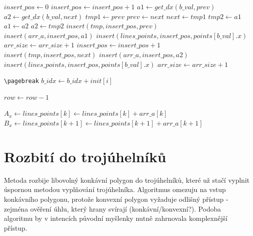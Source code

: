 \documentclass[a4paper,12pt]{report}
\begin{document}
\begin{algorithm}[H]
\begin{algorithmic}
\State $insert\_pos \gets 0$
\State $insert\_pos \gets insert\_pos+1$
\EndWhile
\State $a1 \gets get\_dx(b\_val,prev)$
\State $a2 \gets get\_dx(b\_val,next)$
\State $tmp1 \gets prev$
\State $prev \gets next$
\State $next \gets tmp1$
\State $tmp2 \gets a1$
\State $a1 \gets a2$
\State $a2 \gets tmp2$
\EndIf
{}
\State $insert(tmp,insert\_pos,prev)$
\State $insert(arr\_a,insert\_pos,a1)$
\State $insert(lines\_points,insert\_pos,points[b\_val].x)$
\State $arr\_size \gets arr\_size + 1$
\State $insert\_pos \gets insert\_pos + 1$
\EndIf
{}
\State $insert(tmp,insert\_pos,next)$
\State $insert(arr\_a,insert\_pos,a2)$
\State $insert(lines\_points,insert\_pos,points[b\_val].x)$
\State $arr\_size \gets arr\_size + 1$
\EndIf
\EndIf
\EndFor

\texttt{\textbackslash{}pagebreak}
\State $b\_idx \gets b\_idx + init[i]$

	\State $row \gets row-1$

	\State $A_x \gets lines\_points[k] \gets lines\_points[k] + arr\_a[k]$
	\State $B_x \gets lines\_points[k+1] \gets lines\_points[k+1] + arr\_a[k+1]$
	\\
	\EndFor	
\EndFor
\EndFor
\EndFor

 \end{algorithmic}
\end{algorithm}





\section{Rozbití do trojúhelníků}

Metoda rozbije libovolný konkávní polygon do trojúhelníků, které už stačí vyplnit úspornou metodou vyplňování trojúhelníka.
Algoritmus omezuju na vstup konkávního polygonu, protože konvexní polygon vyžaduje odlišný přístup - zejména ověření úhlu, který hrany svírají (konkávní/konvexní?). Podoba algoritmu by v intencích původní myšlenky nutně zahrnovala komplexnější přístup.
\end{document}
